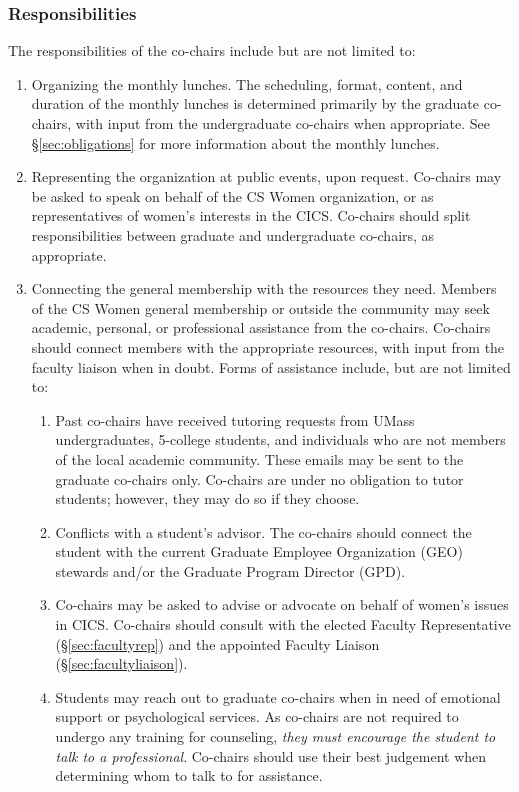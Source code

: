 \subsubsection{Responsibilities}
\label{sec:cochairs_responsibilities}
The responsibilities of the co-chairs include but are not limited to:
\begin{enumerate}
	\item\label{item:lunch} Organizing the monthly lunches. The scheduling, format, content, and duration of the monthly lunches is determined primarily by the graduate co-chairs, with input from the undergraduate co-chairs when appropriate. See \S\ref{sec:obligations} for more information about the monthly lunches.
	\item\label{item:representation} Representing the organization at public events, upon request. Co-chairs may be asked to speak on behalf of the CS Women organization, or as representatives of women's interests in the CICS. Co-chairs should split responsibilities between graduate and undergraduate co-chairs, as appropriate. 
	\item\label{item:connection} Connecting the general membership with the resources they need. Members of the CS Women general membership or outside the community may seek academic, personal, or professional assistance from the co-chairs. Co-chairs should connect members with the appropriate resources, with input from the faculty liaison when in doubt. Forms of assistance include, but are not limited to:
	\begin{enumerate}
	\item\label{item:tutoring} Past co-chairs have received tutoring requests from UMass undergraduates, 5-college students, and individuals who are not members of the local academic community. These emails may be sent to the  graduate co-chairs only. Co-chairs are under no obligation to tutor students; however, they may do so if they choose. 
	\item\label{item:geo} Conflicts with a student's advisor. The co-chairs should connect the student with the current Graduate Employee Organization (GEO) stewards and/or the Graduate Program Director (GPD).
	\item\label{item:womens} Co-chairs may be asked to advise or advocate on behalf of women's issues in CICS. Co-chairs should consult with the elected Faculty Representative (\S\ref{sec:facultyrep}) and the appointed Faculty Liaison (\S\ref{sec:facultyliaison}).
	\item\label{item:psych} Students may reach out to graduate co-chairs when in need of emotional support or psychological services. As co-chairs are not required to undergo any training for counseling, \emph{they must encourage the student to talk to a professional}. Co-chairs should use their best judgement when determining whom to talk to for assistance.

\end{enumerate}
\end{enumerate}
